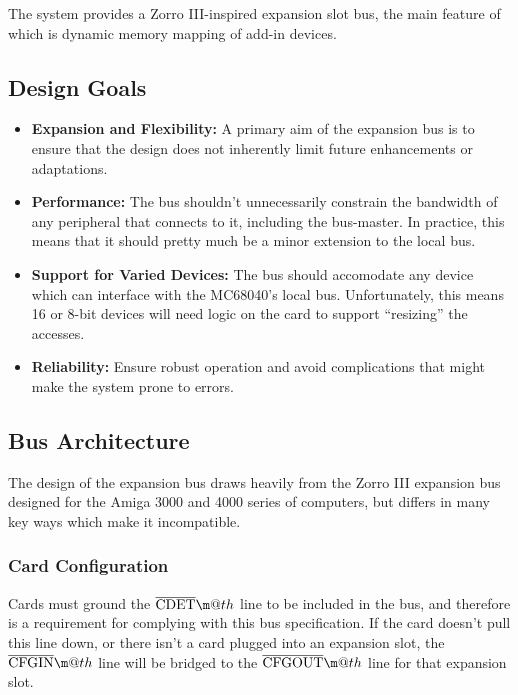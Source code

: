 \documentclass{article}
\makeatletter
\newcommand*{\textoverline}[1]{$\overline{\hbox{#1}}\m@th$}
\makeatother
\begin{document}
The system provides a Zorro III-inspired expansion slot bus, the main feature of
which is dynamic memory mapping of add-in devices. 

\subsection{Design Goals}

\begin{itemize}
	\item \textbf{Expansion and Flexibility:} A primary aim of the expansion
	bus is to ensure that the design does not inherently limit future
	enhancements or adaptations.

	\item \textbf{Performance:} The bus shouldn't unnecessarily constrain
	the bandwidth of any peripheral that connects to it, including the
	bus-master. In practice, this means that it should pretty much be a
	minor extension to the local bus.

	\item \textbf{Support for Varied Devices:} The bus should accomodate any
	device which can interface with the MC68040's local bus. Unfortunately,
	this means 16 or 8-bit devices will need logic on the card to support
	``resizing'' the accesses.

	\item \textbf{Reliability:} Ensure robust operation and avoid
	complications that might make the system prone to errors.
\end{itemize}

\subsection{Bus Architecture}

The design of the expansion bus draws heavily from the Zorro III expansion bus
designed for the Amiga 3000 and 4000 series of computers, but differs in many
key ways which make it incompatible.

\subsubsection{Card Configuration}

Cards must ground the \textoverline{CDET} line to be included in the
bus, and therefore is a requirement for complying with this bus specification.
If the card doesn't pull this line down, or there isn't a card plugged into an
expansion slot, the \textoverline{CFGIN} line will be bridged to the
\textoverline{CFGOUT} line for that expansion slot.
\end{document}
